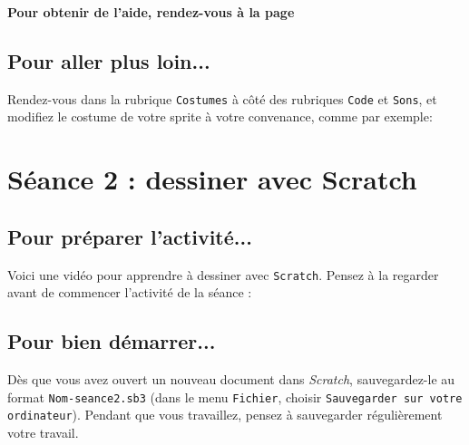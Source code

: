 \textbf{Pour obtenir de l'aide, rendez-vous à la page \pageref{correction_scratch1}}

\subsection{Pour aller plus loin...}

Rendez-vous dans la rubrique \texttt{Costumes} à côté des rubriques \texttt{Code} et \texttt{Sons}, et modifiez le costume de votre sprite à votre convenance, comme par exemple:


\newpage

%
%
%
%









\section{Séance 2 : dessiner avec Scratch}\label{ficheScratch2}

\vspace{20pt}

\subsection{Pour préparer l'activité...}

Voici une vidéo pour apprendre à dessiner avec \texttt{Scratch}. Pensez à la regarder avant de commencer l'activité de la séance :

\begin{center}
\end{center}



\vspace{20pt}

\subsection{Pour bien démarrer...}

Dès que vous avez ouvert un nouveau document dans \emph{Scratch}, sauvegardez-le au format \texttt{Nom-seance2.sb3}  (dans le menu \texttt{Fichier}, choisir \texttt{Sauvegarder sur votre ordinateur}). Pendant que vous travaillez, pensez à sauvegarder régulièrement votre travail.   

